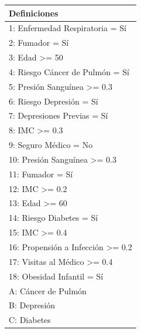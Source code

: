 \begin{figure}[H]
\centering
\begin{minipage}{0.4\textwidth}  %
    \begin{tabular}{|l|}
    \hline
    \textbf{Definiciones} \\
    \hline
    1: Enfermedad Respiratoria = Sí \\
    2: Fumador = Sí \\
    3: Edad >= 50 \\
    4: Riesgo Cáncer de Pulmón = Sí \\
    5: Presión Sanguínea >= 0.3 \\
    6: Riesgo Depresión = Sí \\
    7: Depresiones Previas = Sí \\
    8: IMC >= 0.3 \\
    9: Seguro Médico = No \\
    10: Presión Sanguínea >= 0.3 \\
    11: Fumador = Sí \\
    12: IMC >= 0.2 \\
    13: Edad >= 60 \\
    14: Riesgo Diabetes = Sí \\
    15: IMC >= 0.4 \\
    16: Propensión a Infección >= 0.2 \\
    17: Visitas al Médico >= 0.4 \\
    18: Obesidad Infantil = Sí \\
    A: Cáncer de Pulmón \\
    B: Depresión \\
    C: Diabetes \\
    \hline
    \end{tabular}
\end{minipage}%
\hfill  %
\begin{minipage}{0.55\textwidth}  %
\end{minipage}
\end{figure}
